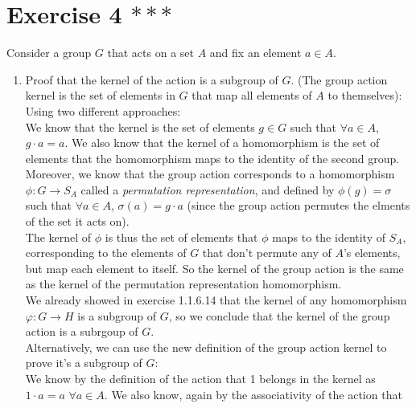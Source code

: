 \documentclass{article}
\begin{document}
    \section*{Exercise 4 $***$}
    Consider a group $G$ that acts on a set $A$
    and fix an element $a \in A$. \\
    \begin{enumerate}[label=\textbf{\alph*.}]
        \item 
            Proof that the kernel of the action is a subgroup of $G$.
            (The group action kernel is the set of elements in $G$ that
            map all elements of $A$ to themselves): \\
            Using two different approaches: \\
            We know that the kernel is the set of elements $g \in G$
            such that $\forall a \in A$, $g \cdot a = a$.
            We also know that the kernel of a homomorphism is the set
            of elements that the homomorphism maps to the identity of
            the second group. \\ 
            Moreover, we know that the group action corresponds to
            a homomorphism $\phi: G \to S_A$
            called a \textit{permutation representation},
            and defined by $\phi(g) = \sigma$
            such that $\forall a \in A$, $\sigma(a) = g \cdot a$
            (since the group action permutes the elments of the set
            it acts on). \\
            The kernel of $\phi$ is thus the set of elements that
            $\phi$ maps to the identity of $S_A$, corresponding
            to the elements of $G$ that don't permute any of $A$'s elements,
            but map each element to itself.
            So the kernel of the group action is the same as the kernel
            of the permutation representation homomorphism. \\
            We already showed in exercise 1.1.6.14 that the kernel
            of any homomorphism $\varphi: G \to H$ is a subgroup of $G$,
            so we conclude that the kernel of the group action is
            a subrgoup of $G$. \\
            Alternatively, we can use the new definition of the group action
            kernel to prove it's a subgroup of $G$: \\
            We know by the definition of the action that 1 belongs
            in the kernel as $1 \cdot a = a$ $\forall a \in A$.
            We also know, again by the associativity of the action that

\end{enumerate}
\end{document}
